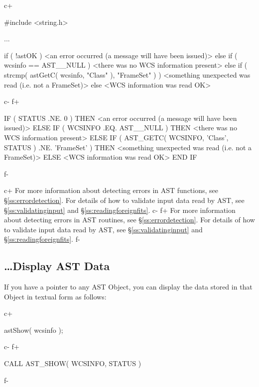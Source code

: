\documentclass[twoside,11pt]{starlink}
\providecommand{\secref}[1]{\S\ref{#1}}
\begin{document}
c+
\begin{small}
\begin{terminalv}
#include <string.h>

...

if ( !astOK ) {
   <an error occurred (a message will have been issued)>
} else if ( wcsinfo == AST__NULL ) {
   <there was no WCS information present>
} else if ( strcmp( astGetC( wcsinfo, "Class" ), "FrameSet" ) ) {
   <something unexpected was read (i.e. not a FrameSet)>
} else {
   <WCS information was read OK>
}
\end{terminalv}
\end{small}
c-
f+
\small
\begin{terminalv}
      IF ( STATUS .NE. 0 ) THEN
         <an error occurred (a message will have been issued)>
      ELSE IF ( WCSINFO .EQ. AST__NULL ) THEN
         <there was no WCS information present>
      ELSE IF ( AST_GETC( WCSINFO, 'Class', STATUS ) .NE. 'FrameSet' ) THEN
         <something unexpected was read (i.e. not a FrameSet)>
      ELSE
         <WCS information was read OK>
      END IF
\end{terminalv}
\normalsize
f-

c+
For more information about detecting errors in AST functions, see
\secref{ss:errordetection}. For details of how to validate input data
read by AST, see \secref{ss:validatinginput} and
\secref{ss:readingforeignfits}.
c-
f+
For more information about detecting errors in AST routines, see
\secref{ss:errordetection}. For details of how to validate input data
read by AST, see \secref{ss:validatinginput} and
\secref{ss:readingforeignfits}.
f-

\subsection{\ldots Display AST Data}

If you have a pointer to any AST Object, you can display the data
stored in that Object in textual form as follows:

c+
\begin{small}
\begin{terminalv}
astShow( wcsinfo );
\end{terminalv}
\end{small}
c-
f+
\begin{small}
\begin{terminalv}
      CALL AST_SHOW( WCSINFO, STATUS )
\end{terminalv}
\end{small}
f-
\end{document}
